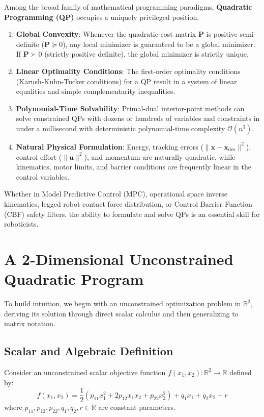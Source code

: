 \documentclass[11pt,a4paper]{article}
\begin{document}
Among the broad family of mathematical programming paradigms, \textbf{Quadratic Programming (QP)} occupies a uniquely privileged position:
\begin{enumerate}
    \item \textbf{Global Convexity}: Whenever the quadratic cost matrix $\mathbf{P}$ is positive semi-definite ($\mathbf{P} \succeq 0$), any local minimizer is guaranteed to be a global minimizer. If $\mathbf{P} \succ 0$ (strictly positive definite), the global minimizer is strictly unique.
    \item \textbf{Linear Optimality Conditions}: The first-order optimality conditions (Karush-Kuhn-Tucker conditions) for a QP result in a system of linear equalities and simple complementarity inequalities.
    \item \textbf{Polynomial-Time Solvability}: Primal-dual interior-point methods can solve constrained QPs with dozens or hundreds of variables and constraints in under a millisecond with deterministic polynomial-time complexity $\mathcal{O}(n^3)$.
    \item \textbf{Natural Physical Formulation}: Energy, tracking errors ($\|\mathbf{x} - \mathbf{x}_{\mathrm{des}}\|^2$), control effort ($\|\mathbf{u}\|^2$), and momentum are naturally quadratic, while kinematics, motor limits, and barrier conditions are frequently linear in the control variables.
\end{enumerate}

Whether in Model Predictive Control (MPC), operational space inverse kinematics, legged robot contact force distribution, or Control Barrier Function (CBF) safety filters, the ability to formulate and solve QPs is an essential skill for roboticists.

\section{A 2-Dimensional Unconstrained Quadratic Program}

To build intuition, we begin with an unconstrained optimization problem in $\mathbb{R}^2$, deriving its solution through direct scalar calculus and then generalizing to matrix notation.

\subsection{Scalar and Algebraic Definition}
Consider an unconstrained scalar objective function $f(x_1, x_2): \mathbb{R}^2 \to \mathbb{R}$ defined by:
\begin{equation}
f(x_1, x_2) = \frac{1}{2} \left( p_{11} x_1^2 + 2 p_{12} x_1 x_2 + p_{22} x_2^2 \right) + q_1 x_1 + q_2 x_2 + r
\label{eq:scalar_qp}
\end{equation}
where $p_{11}, p_{12}, p_{22}, q_1, q_2, r \in \mathbb{R}$ are constant parameters.
\end{document}
